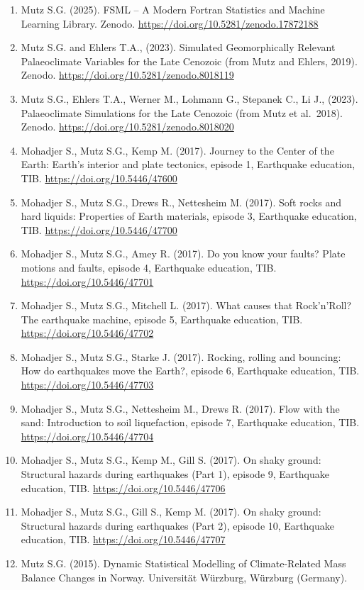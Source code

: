 \documentclass[
  letterpaper,
  DIV=11,
  numbers=noendperiod]{scrartcl}
\begin{document}
\begin{enumerate}
\def\labelenumi{\arabic{enumi}.}
\item
  Mutz S.G. (2025). FSML -- A Modern Fortran Statistics and Machine
  Learning Library. Zenodo.
  \url{https://doi.org/10.5281/zenodo.17872188}
\item
  Mutz S.G. and Ehlers T.A., (2023). Simulated Geomorphically Relevant
  Palaeoclimate Variables for the Late Cenozoic (from Mutz and Ehlers,
  2019). Zenodo. \url{https://doi.org/10.5281/zenodo.8018119}
\item
  Mutz S.G., Ehlers T.A., Werner M., Lohmann G., Stepanek C., Li J.,
  (2023). Palaeoclimate Simulations for the Late Cenozoic (from Mutz et
  al.~2018). Zenodo. \url{https://doi.org/10.5281/zenodo.8018020}
\item
  Mohadjer S., Mutz S.G., Kemp M. (2017). Journey to the Center of the
  Earth: Earth's interior and plate tectonics, episode 1, Earthquake
  education, TIB. \url{https://doi.org/10.5446/47600}
\item
  Mohadjer S., Mutz S.G., Drews R., Nettesheim M. (2017). Soft rocks and
  hard liquids: Properties of Earth materials, episode 3, Earthquake
  education, TIB. \url{https://doi.org/10.5446/47700}
\item
  Mohadjer S., Mutz S.G., Amey R. (2017). Do you know your faults? Plate
  motions and faults, episode 4, Earthquake education, TIB.
  \url{https://doi.org/10.5446/47701}
\item
  Mohadjer S., Mutz S.G., Mitchell L. (2017). What causes that
  Rock'n'Roll? The earthquake machine, episode 5, Earthquake education,
  TIB. \url{https://doi.org/10.5446/47702}
\item
  Mohadjer S., Mutz S.G., Starke J. (2017). Rocking, rolling and
  bouncing: How do earthquakes move the Earth?, episode 6, Earthquake
  education, TIB. \url{https://doi.org/10.5446/47703}
\item
  Mohadjer S., Mutz S.G., Nettesheim M., Drews R. (2017). Flow with the
  sand: Introduction to soil liquefaction, episode 7, Earthquake
  education, TIB. \url{https://doi.org/10.5446/47704}
\item
  Mohadjer S., Mutz S.G., Kemp M., Gill S. (2017). On shaky ground:
  Structural hazards during earthquakes (Part 1), episode 9, Earthquake
  education, TIB. \url{https://doi.org/10.5446/47706}
\item
  Mohadjer S., Mutz S.G., Gill S., Kemp M. (2017). On shaky ground:
  Structural hazards during earthquakes (Part 2), episode 10, Earthquake
  education, TIB. \url{https://doi.org/10.5446/47707}
\item
  Mutz S.G. (2015). Dynamic Statistical Modelling of Climate-Related
  Mass Balance Changes in Norway. Universität Würzburg, Würzburg
  (Germany).
\end{enumerate}
\end{document}
